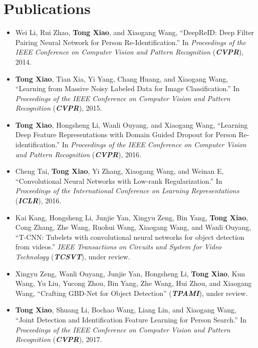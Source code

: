 \chapter*{Publications}

\begin{itemize}
  \item Wei Li, Rui Zhao, \textbf{Tong Xiao}, and Xiaogang Wang, ``DeepReID: Deep Filter Pairing Neural Network for Person Re-Identification.'' In \textit{Proceedings of the IEEE Conference on Computer Vision and Pattern Recognition} (\textit{\textbf{CVPR}}), 2014.

  \item \textbf{Tong Xiao}, Tian Xia, Yi Yang, Chang Huang, and Xiaogang Wang, ``Learning from Massive Noisy Labeled Data for Image Classification.'' In \textit{Proceedings of the IEEE Conference on Computer Vision and Pattern Recognition} (\textit{\textbf{CVPR}}), 2015.

  \item \textbf{Tong Xiao}, Hongsheng Li, Wanli Ouyang, and Xiaogang Wang, ``Learning Deep Feature Representations with Domain Guided Dropout for Person Re-identification.'' In \textit{Proceedings of the IEEE Conference on Computer Vision and Pattern Recognition} (\textit{\textbf{CVPR}}), 2016.

  \item Cheng Tai, \textbf{Tong Xiao}, Yi Zhang, Xiaogang Wang, and Weinan E, ``Convolutional Neural Networks with Low-rank Regularization.'' In \textit{Proceedings of the International Conference on Learning Representations} (\textit{\textbf{ICLR}}), 2016.

  \item Kai Kang, Hongsheng Li, Junjie Yan, Xingyu Zeng, Bin Yang, \textbf{Tong Xiao}, Cong Zhang, Zhe Wang, Ruohui Wang, Xiaogang Wang, and Wanli Ouyang, ``T-CNN: Tubelets with convolutional neural networks for object detection from videos.'' \textit{IEEE Transactions on Circuits and System for Video Technology} (\textit{\textbf{TCSVT}}), under review.

  \item Xingyu Zeng, Wanli Ouyang, Junjie Yan, Hongsheng Li, \textbf{Tong Xiao}, Kun Wang, Yu Liu, Yucong Zhou, Bin Yang, Zhe Wang, Hui Zhou, and Xiaogang Wang, ``Crafting GBD-Net for Object Detection'' (\textit{\textbf{TPAMI}}), under review.

  \item \textbf{Tong Xiao}, Shuang Li, Bochao Wang, Liang Lin, and Xiaogang Wang, ``Joint Detection and Identification Feature Learning for Person Search.'' In \textit{Proceedings of the IEEE Conference on Computer Vision and Pattern Recognition} (\textit{\textbf{CVPR}}), 2017.


\end{itemize}
